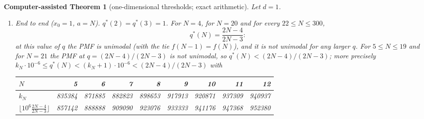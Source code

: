 \documentclass[11pt,a4paper]{article}
\newtheorem{catheorem}[theorem]{Computer-assisted Theorem}
\theoremstyle{definition}
\begin{document}
\begin{catheorem}[one-dimensional thresholds; exact arithmetic]\label{thm:thr1d}
Let $d=1$.
\begin{enumerate}
\item[(a)] \emph{End to end} ($x_0=1$, $a=N$). $q^*(2)=q^*(3)=1$. For $N=4$, for $N=20$ and for every $22\le N\le300$,
\[
q^*(N)=\frac{2N-4}{2N-3}:
\]
at this value of $q$ the PMF is unimodal (with the tie $f(N-1)=f(N)$), and it is not unimodal for any larger $q$. For $5\le N\le19$ and for $N=21$ the PMF at $q=(2N-4)/(2N-3)$ is \emph{not} unimodal, so $q^*(N)<(2N-4)/(2N-3)$; more precisely $k_N\cdot10^{-6}\le q^*(N)<(k_N+1)\cdot10^{-6}<(2N-4)/(2N-3)$ with
\begin{center}\small
\begin{tabular}{@{}lrrrrrrrr@{}}\toprule
$N$ & 5 & 6 & 7 & 8 & 9 & 10 & 11 & 12\\\midrule
$k_N$ & 835384 & 871885 & 882823 & 898653 & 917913 & 920871 & 937309 & 940937\\
$\lfloor10^6\frac{2N-4}{2N-3}\rfloor$ & 857142 & 888888 & 909090 & 923076 & 933333 & 941176 & 947368 & 952380\\\bottomrule
\end{tabular}


\end{center}
\end{enumerate}
\end{catheorem}
\end{document}
